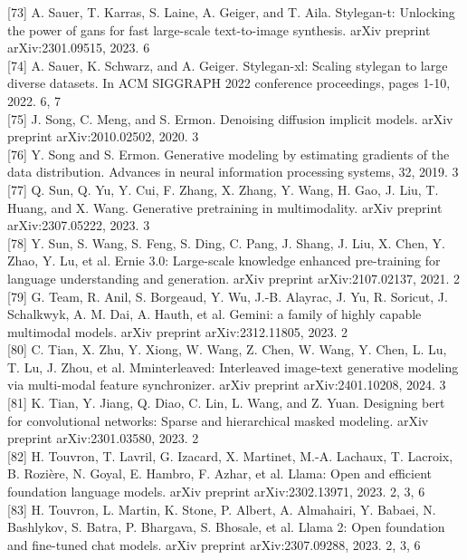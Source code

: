 \documentclass{article}
\begin{document}
[73] A. Sauer, T. Karras, S. Laine, A. Geiger, and T. Aila. Stylegan-t: Unlocking the power of gans for fast large-scale text-to-image synthesis. arXiv preprint arXiv:2301.09515, 2023. 6\\[0pt]
[74] A. Sauer, K. Schwarz, and A. Geiger. Stylegan-xl: Scaling stylegan to large diverse datasets. In ACM SIGGRAPH 2022 conference proceedings, pages 1-10, 2022. 6, 7\\[0pt]
[75] J. Song, C. Meng, and S. Ermon. Denoising diffusion implicit models. arXiv preprint arXiv:2010.02502, 2020. 3\\[0pt]
[76] Y. Song and S. Ermon. Generative modeling by estimating gradients of the data distribution. Advances in neural information processing systems, 32, 2019. 3\\[0pt]
[77] Q. Sun, Q. Yu, Y. Cui, F. Zhang, X. Zhang, Y. Wang, H. Gao, J. Liu, T. Huang, and X. Wang. Generative pretraining in multimodality. arXiv preprint arXiv:2307.05222, 2023. 3\\[0pt]
[78] Y. Sun, S. Wang, S. Feng, S. Ding, C. Pang, J. Shang, J. Liu, X. Chen, Y. Zhao, Y. Lu, et al. Ernie 3.0: Large-scale knowledge enhanced pre-training for language understanding and generation. arXiv preprint arXiv:2107.02137, 2021. 2\\[0pt]
[79] G. Team, R. Anil, S. Borgeaud, Y. Wu, J.-B. Alayrac, J. Yu, R. Soricut, J. Schalkwyk, A. M. Dai, A. Hauth, et al. Gemini: a family of highly capable multimodal models. arXiv preprint arXiv:2312.11805, 2023. 2\\[0pt]
[80] C. Tian, X. Zhu, Y. Xiong, W. Wang, Z. Chen, W. Wang, Y. Chen, L. Lu, T. Lu, J. Zhou, et al. Mminterleaved: Interleaved image-text generative modeling via multi-modal feature synchronizer. arXiv preprint arXiv:2401.10208, 2024. 3\\[0pt]
[81] K. Tian, Y. Jiang, Q. Diao, C. Lin, L. Wang, and Z. Yuan. Designing bert for convolutional networks: Sparse and hierarchical masked modeling. arXiv preprint arXiv:2301.03580, 2023. 2\\[0pt]
[82] H. Touvron, T. Lavril, G. Izacard, X. Martinet, M.-A. Lachaux, T. Lacroix, B. Rozière, N. Goyal, E. Hambro, F. Azhar, et al. Llama: Open and efficient foundation language models. arXiv preprint arXiv:2302.13971, 2023. 2, 3, 6\\[0pt]
[83] H. Touvron, L. Martin, K. Stone, P. Albert, A. Almahairi, Y. Babaei, N. Bashlykov, S. Batra, P. Bhargava, S. Bhosale, et al. Llama 2: Open foundation and fine-tuned chat models. arXiv preprint arXiv:2307.09288, 2023. 2, 3, 6\\[0pt]
\end{document}
